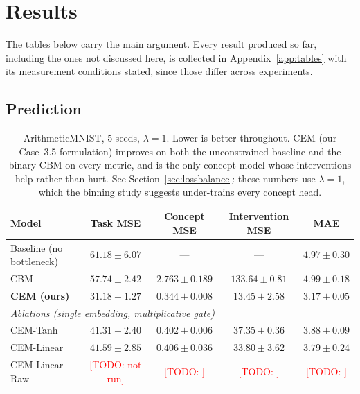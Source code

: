 \documentclass[11pt]{article}
\newcommand{\todo}[1]{\textcolor{red}{[TODO: #1]}}
\begin{document}
\section{Results}
\label{sec:results}

The tables below carry the main argument. Every result produced so far,
including the ones not discussed here, is collected in
Appendix~\ref{app:tables} with its measurement conditions stated, since those
differ across experiments.

\subsection{Prediction}

\begin{table}[t]
\centering
\caption{ArithmeticMNIST, 5 seeds, $\lambda = 1$. Lower is better throughout.
CEM (our Case~3.5 formulation) improves on both the unconstrained baseline and
the binary CBM on every metric, and is the only concept model whose
interventions help rather than hurt. See Section~\ref{sec:lossbalance}: these
numbers use $\lambda = 1$, which the binning study suggests under-trains every
concept head.}
\label{tab:mnist}
\begin{tabular}{lcccc}
\toprule
\textbf{Model} & \textbf{Task MSE} & \textbf{Concept MSE} &
\textbf{Intervention MSE} & \textbf{MAE} \\
\midrule
Baseline (no bottleneck) & $61.18 \pm 6.07$ & --- & --- & $4.97 \pm 0.30$ \\
CBM \citep{koh2020concept}       & $57.74 \pm 2.42$ & $2.763 \pm 0.189$ & $133.64 \pm 0.81$ & $4.99 \pm 0.18$ \\
\textbf{CEM (ours)}              & $\mathbf{31.18 \pm 1.27}$ & $\mathbf{0.344 \pm 0.008}$ & $\mathbf{13.45 \pm 2.58}$ & $\mathbf{3.17 \pm 0.05}$ \\
\midrule
\multicolumn{5}{l}{\emph{Ablations (single embedding, multiplicative gate)}} \\
CEM-Tanh                         & $41.31 \pm 2.40$ & $0.402 \pm 0.006$ & $37.35 \pm 0.36$ & $3.88 \pm 0.09$ \\
CEM-Linear                       & $41.59 \pm 2.85$ & $0.406 \pm 0.036$ & $33.80 \pm 3.62$ & $3.79 \pm 0.24$ \\
CEM-Linear-Raw                   & \todo{not run} & \todo{} & \todo{} & \todo{} \\
\bottomrule
\end{tabular}
\end{table}
\end{document}
